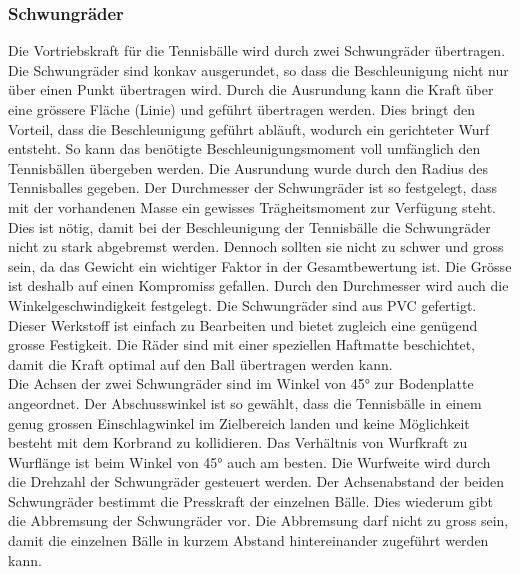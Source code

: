 \subsubsection{Schwungräder}
Die Vortriebskraft für die Tennisbälle wird durch zwei Schwungräder übertragen. Die Schwungräder sind konkav ausgerundet, so dass die Beschleunigung nicht nur über einen Punkt übertragen wird. Durch die Ausrundung kann die Kraft über eine grössere Fläche (Linie) und geführt übertragen werden. Dies bringt den Vorteil, dass die Beschleunigung geführt abläuft, wodurch ein gerichteter Wurf entsteht. So kann das benötigte Beschleunigungsmoment voll umfänglich den Tennisbällen übergeben werden. Die Ausrundung wurde durch den Radius des Tennisballes gegeben. Der Durchmesser der Schwungräder ist so festgelegt, dass mit der vorhandenen Masse ein gewisses Trägheitsmoment zur Verfügung steht. Dies ist nötig, damit bei der Beschleunigung der Tennisbälle die Schwungräder nicht zu stark abgebremst werden. Dennoch sollten sie nicht zu schwer und gross sein, da das Gewicht ein wichtiger Faktor in der Gesamtbewertung ist. Die Grösse ist deshalb auf einen Kompromiss gefallen. Durch den Durchmesser wird auch die Winkelgeschwindigkeit festgelegt. Die Schwungräder sind aus PVC gefertigt. Dieser Werkstoff ist einfach zu Bearbeiten und bietet zugleich eine genügend grosse Festigkeit. Die Räder sind mit einer speziellen Haftmatte beschichtet, damit die Kraft optimal auf den Ball übertragen werden kann. \\
Die Achsen der zwei Schwungräder sind im Winkel von 45° zur Bodenplatte angeordnet. Der Abschusswinkel ist so gewählt, dass die Tennisbälle in einem genug grossen Einschlagwinkel im Zielbereich landen und keine Möglichkeit besteht mit dem Korbrand zu kollidieren. Das Verhältnis von Wurfkraft zu Wurflänge ist beim Winkel von 45° auch am besten. Die Wurfweite wird durch die Drehzahl der Schwungräder gesteuert werden. Der Achsenabstand der beiden Schwungräder bestimmt die Presskraft der einzelnen Bälle. Dies wiederum gibt die Abbremsung der Schwungräder vor. Die Abbremsung darf nicht zu gross sein, damit die einzelnen Bälle in kurzem Abstand hintereinander zugeführt werden kann. 
